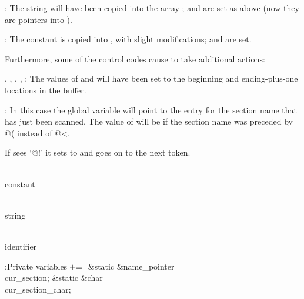 \yskip\hang {}: The string will have been copied into the array
;  and  are set as
above (now they are
pointers into ).

\yskip\hang {}: The constant is copied into , with
slight modifications;  and  are set.

\yskip\noindent Furthermore, some of the control codes cause
 to take additional actions:

\yskip\hang {}, , , \PB{$\TeXxstring$},
: The values of  and  will
have been set to
the beginning and ending-plus-one locations in the buffer.

\yskip\hang {}: In this case the global variable  will
point to the  entry for the section name that has just been
scanned.
The value of  will be  if the section
name was
preceded by \.{@(} instead of \.{@<}.

\yskip\noindent If  sees `\.{@!}'
it sets  to  and goes on to the next
token.

\Y\B\4\D\\{constant}\5
\par
\B\4\D\\{string}\5
\par
\B\4\D\\{identifier}\5
\par
\Y\B\4:Private variables\X${}\mathrel+\equiv{}$\6
\&{static} \&{name\_pointer} \\{cur\_section};\6
\&{static} \&{char} \\{cur\_section\_char};\par
\fi

